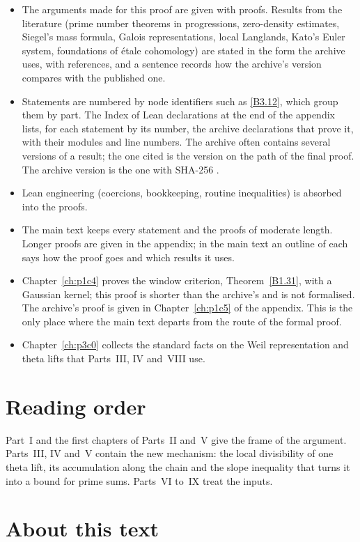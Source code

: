 \begin{itemize}
\item The arguments made for this proof are given with proofs. Results from the literature (prime number theorems in progressions, zero-density estimates, Siegel's mass formula, Galois representations, local Langlands, Kato's Euler system, foundations of étale cohomology) are stated in the form the archive uses, with references, and a sentence records how the archive's version compares with the published one.
\item Statements are numbered by node identifiers such as \ref{B3.12}, which group them by part. The Index of Lean declarations at the end of the appendix lists, for each statement by its number, the archive declarations that prove it, with their modules and line numbers. The archive often contains several versions of a result; the one cited is the version on the path of the final proof. The archive version is the one with SHA-256 .
\item Lean engineering (coercions, bookkeeping, routine inequalities) is absorbed into the proofs.
\item The main text keeps every statement and the proofs of moderate length. Longer proofs are given in the appendix; in the main text an outline of each says how the proof goes and which results it uses.
\item Chapter~\ref{ch:p1c4} proves the window criterion, Theorem~\ref{B1.31}, with a Gaussian kernel; this proof is shorter than the archive's and is not formalised. The archive's proof is given in Chapter~\ref{ch:p1c5} of the appendix. This is the only place where the main text departs from the route of the formal proof.
\item Chapter~\ref{ch:p3c0} collects the standard facts on the Weil representation and theta lifts that Parts~III, IV and~VIII use.
\end{itemize}

\section*{Reading order}

Part~I and the first chapters of Parts~II and~V give the frame of the argument. Parts~III, IV and~V contain the new mechanism: the local divisibility of one theta lift, its accumulation along the chain and the slope inequality that turns it into a bound for prime sums. Parts~VI to~IX treat the inputs.

\section*{About this text}

